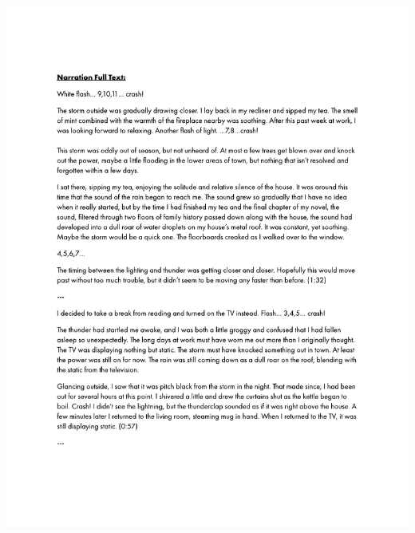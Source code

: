 \begin{center}
     \includegraphics[scale=0.75]{Scores/raindrops_Part19.pdf}
\end{center}
\newpage
